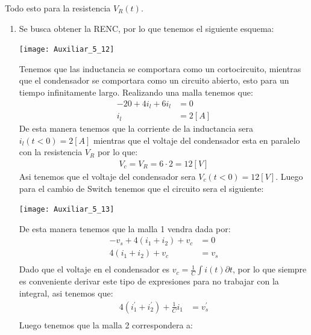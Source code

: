 \documentclass[
  11pt,
  letterpaper,
   addpoints,
   answers
  ]{exam}
\begin{document}
\begin{questions}
Todo esto para la resistencia \(V_R(t)\).
\begin{solution}
    \begin{enumerate}
        \item Se busca obtener la RENC, por lo que tenemos el siguiente esquema:
        \begin{center}
            \texttt{[image: Auxiliar\_5\_12]}
        \end{center}
        Tenemos que las inductancia se comportara como un cortocircuito, mientras que el condensador se comportara como un circuito abierto, esto para un tiempo infinitamente largo. Realizando una malla tenemos que:
        \begin{align}
            -20 + 4i_{l} + 6i_{l} &= 0\\
            i_{l} &= 2[A]
        \end{align}
        De esta manera tenemos que la corriente de la inductancia sera $i_{l}(t<0)= 2[A]$ mientras que el voltaje del condensador esta en paralelo con la resistencia $V_{R}$ por lo que:
        \begin{align}
            V_{c} = V_{R} = 6 \cdot 2 = 12[V]
        \end{align}
        Asi tenemos que el voltaje del condensador sera $V_{c}(t<0)=12[V]$. Luego para el cambio de Switch tenemos que el circuito sera el siguiente:
        \begin{center}
            \texttt{[image: Auxiliar\_5\_13]}
        \end{center}
        De esta manera tenemos que la malla 1 vendra dada por:
        \begin{align}
            -v_{s} + 4(i_{1}+i_{2}) + v_{c} &= 0\\
            4(i_{1}+i_{2}) + v_{c} &=  v_{s}\\
        \end{align}
        Dado que el voltaje en el condensador es $v_{c} = \frac{1}{C} \int i(t) \partial t$, por lo que siempre es conveniente derivar este tipo de expresiones para no trabajar con la integral, asi tenemos que:
        \begin{align}
            4(i_{1}^{'}+i_{2}^{'}) + \frac{1}{C} i_{1} &=  v_{s}^{'}\\
        \end{align}
        Luego tenemos que la malla 2 correspondera a:

\end{enumerate}
\end{solution}
\end{questions}
\end{document}
